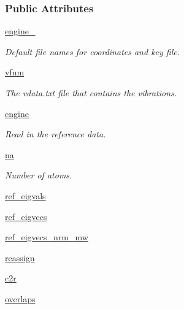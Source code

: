 \subsubsection*{Public Attributes}
\begin{DoxyCompactItemize}
\item 
\hyperlink{classforcebalance_1_1gmxio_1_1Vibration__GMX_aa2da1db9dac5cfdae4ff6a0d6d14e0b4}{engine\-\_\-}
\begin{DoxyCompactList}\small\item\em Default file names for coordinates and key file. \end{DoxyCompactList}\item 
\hyperlink{classforcebalance_1_1vibration_1_1Vibration_a50552dbdadc7a86aaab97bfdcf85e449}{vfnm}
\begin{DoxyCompactList}\small\item\em The vdata.\-txt file that contains the vibrations. \end{DoxyCompactList}\item 
\hyperlink{classforcebalance_1_1vibration_1_1Vibration_ad72d6182d9f2d2a1ba97030635fbdb3d}{engine}
\begin{DoxyCompactList}\small\item\em Read in the reference data. \end{DoxyCompactList}\item 
\hyperlink{classforcebalance_1_1vibration_1_1Vibration_a31148c4d3157dddf2485c4e63496e120}{na}
\begin{DoxyCompactList}\small\item\em Number of atoms. \end{DoxyCompactList}\item 
\hyperlink{classforcebalance_1_1vibration_1_1Vibration_ab9913cb05e66e53a5781237baf9ea2e1}{ref\-\_\-eigvals}
\item 
\hyperlink{classforcebalance_1_1vibration_1_1Vibration_ae9c5479bd3b01ecb3d2d40a9487ccac5}{ref\-\_\-eigvecs}
\item 
\hyperlink{classforcebalance_1_1vibration_1_1Vibration_a6b2b9f1e95bea0edabd46ada819cd005}{ref\-\_\-eigvecs\-\_\-nrm\-\_\-mw}
\item 
\hyperlink{classforcebalance_1_1vibration_1_1Vibration_a6dc3e340d09d4adc415eee905c75b6cc}{reassign}
\item 
\hyperlink{classforcebalance_1_1vibration_1_1Vibration_aadf038fadc7a0d1ca03ba225ebf7edb6}{c2r}
\item 
\hyperlink{classforcebalance_1_1vibration_1_1Vibration_a9ce45d9b33c510d6c1bc78f5f09b1981}{overlaps}

\end{DoxyCompactItemize}
